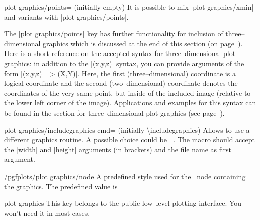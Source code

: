 {{\begin{pgfplotskey}{plot graphics/points= (initially empty)}
	It is possible to mix |plot graphics/xmin| and variants with |plot graphics/points|.

	The |plot graphics/points| key has further functionality for inclusion of three--dimensional graphics which is discussed at the end of this section (on page~\pageref{sec:plotgraphics3d}). Here is a short reference on the accepted syntax for three--dimensional plot graphics: in addition to the |(x,y,z)| syntax, you can provide arguments of the form |(x,y,z) => (X,Y)|. Here, the first (three--dimensional) coordinate is a logical coordinate and the second (two--dimensional) coordinate denotes the coordinates of the very same point, but inside of the included image (relative to the lower left corner of the image). Applications and examples for this syntax can be found in the section for three--dimensional plot graphics (see page~\pageref{sec:plotgraphics3d}).
\end{pgfplotskey}

\begin{pgfplotskey}{plot graphics/includegraphics cmd= (initially \textbackslash includegraphics)}
	Allows to use a different graphics routine. A possible choice could be |\pgfimage|. The macro should accept the |width| and |height| arguments (in brackets) and the file name as first argument.
\end{pgfplotskey}
\begin{stylekey}{/pgfplots/plot graphics/node}
	A predefined style used for the \Tikz\ node containing the graphics. The predefined value is
\begin{codeexample}
\end{codeexample}
\end{stylekey}

\begin{pgfplotskey}{plot graphics}
	This key belongs to the public low--level plotting interface. You won't need it in most cases.


\end{pgfplotskey}}}
